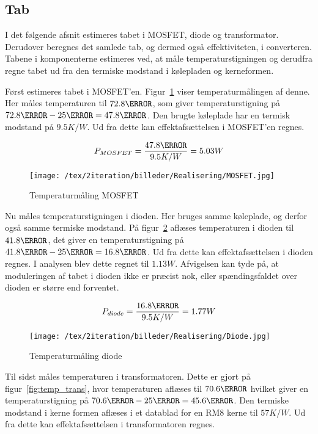 
\subsection{Tab}
I det følgende afsnit estimeres tabet i MOSFET, diode og transformator. Derudover beregnes det samlede tab, og dermed også effektiviteten, i converteren. Tabene i komponenterne estimeres ved, at måle temperaturstigningen og derudfra regne tabet ud fra den termiske modstand i kølepladen og kerneformen.

Først estimeres tabet i MOSFET'en. Figur~\ref{fig:temp_mosfet} viser temperaturmålingen af denne. Her måles temperaturen til $72.8\degreeCelsius$, som giver temperaturstigning på $72.8\degreeCelsius - 25\degreeCelsius = 47.8\degreeCelsius$. Den brugte køleplade har en termisk modstand på $9.5K/W$\cite{Heatsink}. Ud fra dette kan effektafsættelsen i MOSFET'en regnes.

\begin{equation}
P_{MOSFET} = \frac{47.8\degreeCelsius}{9.5K/W} = 5.03W
\end{equation}



\begin{figure}[H]
	\center
	\texttt{[image: /tex/2iteration/billeder/Realisering/MOSFET.jpg]}
	\caption{Temperaturmåling MOSFET}
	\label{fig:temp_mosfet}
\end{figure}

Nu måles temperaturstigningen i dioden. Her bruges samme køleplade, og derfor også samme termiske modstand. På figur~\ref{fig:temp_diode} aflæses temperaturen i dioden til $41.8\degreeCelsius$, det giver en temperaturstigning på $41.8\degreeCelsius - 25\degreeCelsius = 16.8\degreeCelsius$. Ud fra dette kan effektafsættelsen i dioden regnes. I analysen blev dette regnet til $1.13W$. Afvigelsen kan tyde på, at moduleringen af tabet i dioden ikke er præcist nok, eller spændingsfaldet over dioden er større end forventet.

\begin{equation}
P_{diode} = \frac{16.8\degreeCelsius}{9.5K/W} = 1.77W
\end{equation}

\begin{figure}[H]
	\center
	\texttt{[image: /tex/2iteration/billeder/Realisering/Diode.jpg]}
	\caption{Temperaturmåling diode}
	\label{fig:temp_diode}
\end{figure}

Til sidst måles temperaturen i transformatoren. Dette er gjort på figur~\ref{fig:temp_trans}, hvor temperaturen aflæses til $70.6\degreeCelsius$ hvilket giver en temperaturstigning på $70.6\degreeCelsius - 25\degreeCelsius = 45.6\degreeCelsius$. Den termiske modstand i kerne formen aflæses i et datablad for en RM8 kerne til $57K/W$\cite{epcos-cores}. Ud fra dette kan effektafsættelsen i transformatoren regnes.

